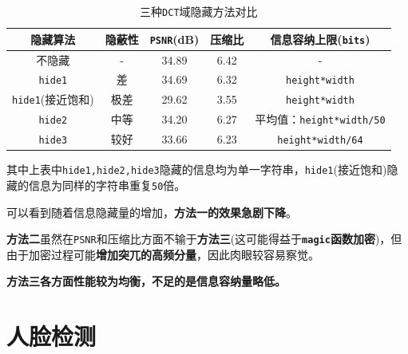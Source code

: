 \documentclass{article}
\numberwithin{figure}{section}
\numberwithin{table}{section}
\numberwithin{listing}{section}
\numberwithin{equation}{section}
\begin{document}
\begin{enumerate}
                \begin{table}[H]
                    \caption{三种\texttt{DCT}域隐藏方法对比}
                    \centering
                
                    \begin{tabular}{|c|c|c|c|c|}
                    \hline
                
                    \hline
                    \textbf{隐藏算法} & \textbf{隐蔽性} & \textbf{\texttt{PSNR}(dB)} & \textbf{压缩比} & \textbf{信息容纳上限(\texttt{bits})} \\
                    \hline
                        不隐藏 & - & 34.89 & 6.42 & - \\
                    \hline
                        \texttt{hide1} & 差 & 34.69 & 6.32 & \texttt{height*width} \\
                    \hline
                        \texttt{hide1}(接近饱和) & 极差 & 29.62 & 3.55 & \texttt{height*width} \\
                    \hline
                        \texttt{hide2} & 中等 & 34.20 & 6.27 & 平均值：\texttt{height*width/50} \\
                    \hline
                        \texttt{hide3} & 较好 & 33.66 & 6.23 & \texttt{height*width/64} \\
                    \hline

                    \hline
                    \end{tabular}
                \end{table}

                其中上表中\texttt{hide1,hide2,hide3}隐藏的信息均为单一字符串，\texttt{hide1}(接近饱和)隐藏的信息为同样的字符串重复\texttt{50}倍。

                可以看到随着信息隐藏量的增加，\textbf{方法一的效果急剧下降}。

                \textbf{方法二}虽然在\texttt{PSNR}和压缩比方面不输于\textbf{方法三}(这可能得益于\textbf{\texttt{magic}函数加密})，但由于加密过程可能\textbf{增加突兀的高频分量}，因此肉眼较容易察觉。

                \textbf{方法三各方面性能较为均衡，不足的是信息容纳量略低。}

        \end{enumerate}


    \newpage
    \section{人脸检测} %
    \label{sec:人脸检测}

        
    
\end{document}
